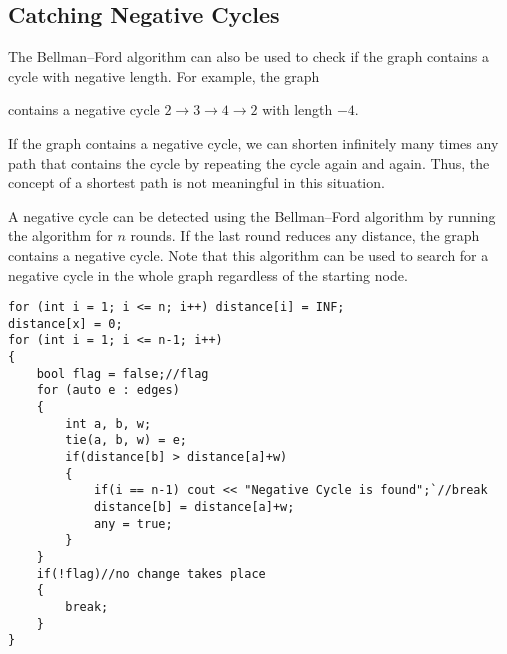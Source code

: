 \documentclass[twoside,12pt,a4paper,english]{book}
\theoremstyle{definition}
\theoremstyle{problemstyle}
\theoremstyle{problemstyle}
\theoremstyle{problemstyle}
\begin{document}
\subsection{Catching Negative Cycles}

The Bellman–Ford algorithm can also be used to
check if the graph contains a cycle with negative length.
For example, the graph

\begin{center}
\end{center}
\noindent
contains a negative cycle
$2 \rightarrow 3 \rightarrow 4 \rightarrow 2$
with length $-4$.

If the graph contains a negative cycle,
we can shorten infinitely many times
any path that contains the cycle by repeating the cycle
again and again.
Thus, the concept of a shortest path
is not meaningful in this situation.

A negative cycle can be detected
using the Bellman–Ford algorithm by
running the algorithm for $n$ rounds.
If the last round reduces any distance,
the graph contains a negative cycle.
Note that this algorithm can be used to
search for
a negative cycle in the whole graph
regardless of the starting node.

\begin{tcolorbox}[title=Solution]

\begin{lstlisting}
for (int i = 1; i <= n; i++) distance[i] = INF;
distance[x] = 0;
for (int i = 1; i <= n-1; i++) 
{
    bool flag = false;//flag
    for (auto e : edges) 
    {
        int a, b, w;
        tie(a, b, w) = e;
        if(distance[b] > distance[a]+w)
        {
            if(i == n-1) cout << "Negative Cycle is found";`//break
            distance[b] = distance[a]+w;
            any = true;
        }
    }
    if(!flag)//no change takes place
    {
        break;
    }
}
\end{lstlisting}

\end{tcolorbox}
\end{document}
